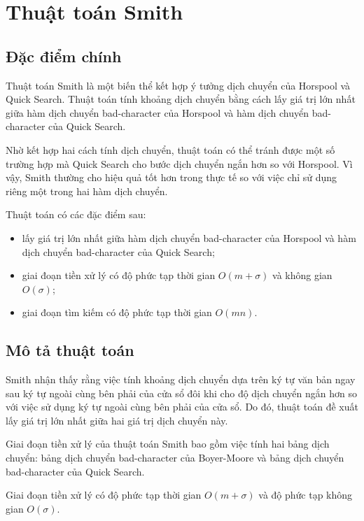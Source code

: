 \section{Thuật toán Smith}

\subsection{Đặc điểm chính}

Thuật toán Smith là một biến thể kết hợp ý tưởng dịch chuyển của Horspool và Quick Search. Thuật toán tính khoảng dịch chuyển bằng cách lấy giá trị lớn nhất giữa hàm dịch chuyển bad-character của Horspool và hàm dịch chuyển bad-character của Quick Search.

Nhờ kết hợp hai cách tính dịch chuyển, thuật toán có thể tránh được một số trường hợp mà Quick Search cho bước dịch chuyển ngắn hơn so với Horspool. Vì vậy, Smith thường cho hiệu quả tốt hơn trong thực tế so với việc chỉ sử dụng riêng một trong hai hàm dịch chuyển.

Thuật toán có các đặc điểm sau:

\begin{itemize}
    \item lấy giá trị lớn nhất giữa hàm dịch chuyển bad-character của Horspool và hàm dịch chuyển bad-character của Quick Search;
    \item giai đoạn tiền xử lý có độ phức tạp thời gian \(O(m+\sigma)\) và không gian \(O(\sigma)\);
    \item giai đoạn tìm kiếm có độ phức tạp thời gian \(O(mn)\).
\end{itemize}

\subsection{Mô tả thuật toán}

Smith nhận thấy rằng việc tính khoảng dịch chuyển dựa trên ký tự văn bản ngay sau ký tự ngoài cùng bên phải của cửa sổ đôi khi cho độ dịch chuyển ngắn hơn so với việc sử dụng ký tự ngoài cùng bên phải của cửa sổ. Do đó, thuật toán đề xuất lấy giá trị lớn nhất giữa hai giá trị dịch chuyển này.

Giai đoạn tiền xử lý của thuật toán Smith bao gồm việc tính hai bảng dịch chuyển: bảng dịch chuyển bad-character của Boyer-Moore và bảng dịch chuyển bad-character của Quick Search.

Giai đoạn tiền xử lý có độ phức tạp thời gian \(O(m+\sigma)\) và độ phức tạp không gian \(O(\sigma)\).

